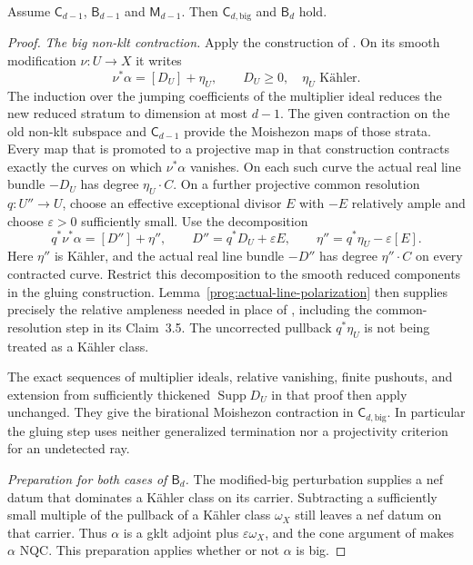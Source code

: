 \begin{lemma}
\label{prog:base-point-free-induction}
Assume $\mathsf C_{d-1}$, $\mathsf B_{d-1}$ and $\mathsf M_{d-1}$.
Then $\mathsf C_{d,\mathrm{big}}$ and $\mathsf B_d$ hold.
\end{lemma}
\begin{proof}
\smallskip\noindent
\emph{The big non-klt contraction.}
Apply the construction of \cite[Section~3]{HX}. On its smooth
modification $\nu:U\to X$ it writes
\[
 \nu^*\alpha=[D_U]+\eta_U,
 \qquad D_U\geq0,\quad \eta_U\text{ K\"ahler}.
\]
The induction over the jumping coefficients of the multiplier
ideal reduces the new reduced stratum to dimension at most $d-1$.
The given contraction on the old non-klt subspace and
$\mathsf C_{d-1}$ provide the Moishezon maps of those strata.
Every map that is promoted to a projective map in that construction
contracts exactly the curves on which $\nu^*\alpha$ vanishes.
On each such curve the actual real line bundle $-D_U$ has degree
$\eta_U\cdot C$. On a further projective common resolution
$q:U''\to U$, choose an effective exceptional divisor $E$ with
$-E$ relatively ample and choose $\varepsilon>0$ sufficiently small.
Use the decomposition
\[
 q^*\nu^*\alpha=[D'']+\eta'',\qquad
 D''=q^*D_U+\varepsilon E,\qquad
 \eta''=q^*\eta_U-\varepsilon[E].
\]
Here $\eta''$ is K\"ahler, and the actual real line bundle $-D''$
has degree $\eta''\cdot C$ on every contracted curve. Restrict this
decomposition to the smooth reduced components in the gluing
construction. Lemma~\ref{prog:actual-line-polarization} then supplies
precisely the relative ampleness needed in place of
\cite[Lemma~2.42]{HX}, including the common-resolution step in its
Claim~3.5. The uncorrected pullback $q^*\eta_U$ is not being treated
as a K\"ahler class.

The exact sequences of multiplier ideals, relative vanishing,
finite pushouts, and extension from sufficiently thickened
$\operatorname{Supp}D_U$ in that proof then apply unchanged.
They give the birational Moishezon contraction in
$\mathsf C_{d,\mathrm{big}}$. In particular the gluing step uses
neither generalized termination nor a projectivity criterion for
an undetected ray.

\smallskip\noindent
\emph{Preparation for both cases of $\mathsf B_d$.}
The modified-big perturbation
\cite[Lemma~2.23]{HX} supplies a nef datum that dominates a
K\"ahler class on its carrier. Subtracting a sufficiently small
multiple of the pullback of a K\"ahler class $\omega_X$ still leaves
a nef datum on that carrier. Thus
$\alpha$ is a gklt adjoint plus $\varepsilon\omega_X$, and the cone
argument of \cite[Lemma~2.45]{HX} makes $\alpha$ NQC.
This preparation applies whether or not $\alpha$ is big.


\end{proof}
